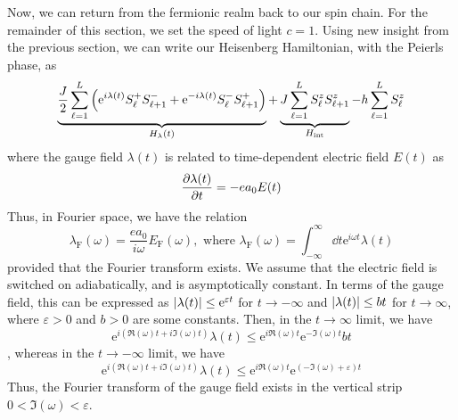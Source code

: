 Now, we can return from the fermionic realm back to our spin chain. For the remainder of this section, we set
the speed of light \(c = 1\). Using new insight from the previous section, we can write our Heisenberg
Hamiltonian, with the Peierls phase, as
\begin{equation}
    \underbrace{\frac{J}{2} \sum_{\ell=1}^{L} \left(\mathrm{e}^{i \lambda(t)} S^{+}_{\ell} S^{-}_{\ell+1} + \mathrm{e}^{-i \lambda(t)} S^{-}_{\ell}S^{+}_{\ell+1} \right)}_{H_{\lambda }(t)}
    + \underbrace{J \sum_{\ell=1}^{L} S^{z}_{\ell}S^{z}_{\ell+1}}_{H_{\text{int}}}
    - h \sum_{\ell=1}^{L} S^{z}_{\ell}
\end{equation}
where the gauge field \(\lambda(t)\) is related to time-dependent electric field \(E(t)\) as
\begin{equation}
    \pdv{\lambda(t)}{t} = - e a_0 E(t)
\end{equation}
Thus, in Fourier space, we have the relation
\begin{equation}
    \lambda_{\mathrm{F}} (\omega) = \frac{e a_0}{i \omega} E_{\mathrm{F}} (\omega), \text{ where } \lambda_{\mathrm{F}} (\omega) = \int_{-\infty}^{\infty} \dd{t} \mathrm{e}^{i \omega t} \lambda(t)
\end{equation}
provided that the Fourier transform exists. We assume that the electric field is switched on adiabatically, and
is asymptotically constant. In terms of the gauge field, this can be expressed as
\(\abs{\lambda (t)} \leq \mathrm{e}^{\varepsilon t} \) for \(t\to -\infty \) and
\(\abs{\lambda (t)} \leq b t \) for \(t\to \infty \), where \(\varepsilon > 0\) and \(b>0\) are some constants.
Then, in the \( t \to \infty \) limit, we have \[\mathrm{e}^{i (\Re(\omega) t + i \Im(\omega) t )} \lambda (t)
    \leq \mathrm{e}^{i \Re (\omega) t}  \mathrm{e}^{- \Im (\omega)  t} b t\], whereas in the \(t \to -\infty \) limit,
we have \[\mathrm{e}^{i (\Re (\omega) t + i \Im (\omega) t )} \lambda (t) \leq \mathrm{e}^{i \Re (\omega) t}
    \mathrm{e}^{(- \Im (\omega) + \varepsilon )t}\]
Thus, the Fourier transform of the gauge field exists in the
vertical strip \(0 < \Im (\omega) < \varepsilon \).

